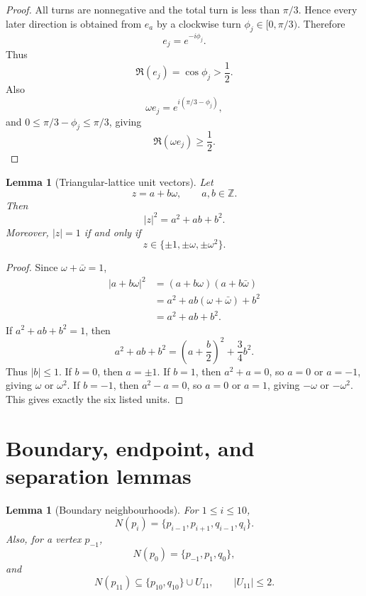 \documentclass[11pt]{article}
\newtheorem{lemma}[theorem]{Lemma}
\begin{document}
\begin{proof}
All turns are nonnegative and the total turn is less than $\pi/3$. Hence every later direction is obtained from $e_a$ by a clockwise turn $\phi_j\in[0,\pi/3)$. Therefore
\[
 e_j=e^{-i\phi_j}.
\]
Thus
\[
 \Re(e_j)=\cos\phi_j>\frac12.
\]
Also
\[
 \omega e_j=e^{i(\pi/3-\phi_j)},
\]
and $0\le \pi/3-\phi_j\le \pi/3$, giving
\[
 \Re(\omega e_j)\ge\frac12.
\]
\end{proof}

\begin{lemma}[Triangular-lattice unit vectors]\label{lem:lattice-units}
Let
\[
 z=a+b\omega,
 \qquad a,b\in\mathbb Z.
\]
Then
\[
 |z|^2=a^2+ab+b^2.
\]
Moreover, $|z|=1$ if and only if
\[
 z\in\{\pm1,\pm\omega,\pm\omega^2\}.
\]
\end{lemma}

\begin{proof}
Since $\omega+\bar\omega=1$,
\[
\begin{aligned}
 |a+b\omega|^2
 &=(a+b\omega)(a+b\bar\omega)\\
 &=a^2+ab(\omega+\bar\omega)+b^2\\
 &=a^2+ab+b^2.
\end{aligned}
\]
If $a^2+ab+b^2=1$, then
\[
 a^2+ab+b^2=\left(a+\frac b2\right)^2+\frac34 b^2.
\]
Thus $|b|\le1$. If $b=0$, then $a=\pm1$. If $b=1$, then $a^2+a=0$, so $a=0$ or $a=-1$, giving $\omega$ or $\omega^2$. If $b=-1$, then $a^2-a=0$, so $a=0$ or $a=1$, giving $-\omega$ or $-\omega^2$. This gives exactly the six listed units.
\end{proof}

\section{Boundary, endpoint, and separation lemmas}

\begin{lemma}[Boundary neighbourhoods]\label{lem:boundary-nbhd}
For $1\le i\le 10$,
\[
 N(p_i)=\{p_{i-1},p_{i+1},q_{i-1},q_i\}.
\]
Also, for a vertex $p_{-1}$,
\[
 N(p_0)=\{p_{-1},p_1,q_0\},
\]
and
\[
 N(p_{11})\subseteq \{p_{10},q_{10}\}\cup U_{11},
 \qquad |U_{11}|\le2.
\]
\end{lemma}
\end{document}
